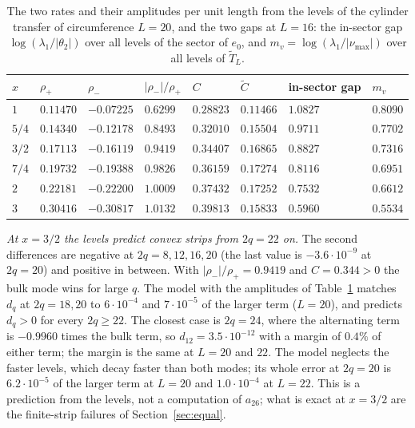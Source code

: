 \documentclass[11pt]{amsart}
\theoremstyle{definition}
\theoremstyle{remark}
\begin{document}
\begin{table}[ht]
\centering
\caption{The two rates and their amplitudes per unit length from the levels of the cylinder
transfer of circumference $L = 20$, and the two gaps at $L = 16$: the in-sector gap
$\log(\lambda_1/|\theta_2|)$ over all levels of the sector of $e_0$, and $m_v = \log(\lambda_1/
|\nu_{\max}|)$ over all levels of $\tilde T_L$.}\label{tab:levels}
\begin{tabular}{llllllll}
\toprule
$x$ & $\rho_+$ & $\rho_-$ & $|\rho_-|/\rho_+$ & $C$ & $\tilde C$ & in-sector gap & $m_v$ \\
\midrule
$1$     & $0.11470$ & $-0.07225$ & $0.6299$ & $0.28823$ & $0.11466$ & $1.0827$ & $0.8090$ \\
$5/4$   & $0.14340$ & $-0.12178$ & $0.8493$ & $0.32010$ & $0.15504$ & $0.9711$ & $0.7702$ \\
$3/2$   & $0.17113$ & $-0.16119$ & $0.9419$ & $0.34407$ & $0.16865$ & $0.8827$ & $0.7316$ \\
$7/4$   & $0.19732$ & $-0.19388$ & $0.9826$ & $0.36159$ & $0.17274$ & $0.8116$ & $0.6951$ \\
$2$     & $0.22181$ & $-0.22200$ & $1.0009$ & $0.37432$ & $0.17252$ & $0.7532$ & $0.6612$ \\
$3$     & $0.30416$ & $-0.30817$ & $1.0132$ & $0.39813$ & $0.15833$ & $0.5960$ & $0.5534$ \\
\bottomrule
\end{tabular}
\end{table}

\emph{At $x = 3/2$ the levels predict convex strips from $2q = 22$ on.} The second differences are negative at
$2q = 8, 12, 16, 20$ (the last value is $-3.6\cdot10^{-9}$ at $2q = 20$) and positive in between. With
$|\rho_-|/\rho_+ = 0.9419$ and $C = 0.344 > 0$ the bulk mode wins for large $q$. The model with the
amplitudes of Table~\ref{tab:levels} matches $d_q$ at $2q = 18, 20$ to $6\cdot10^{-4}$ and
$7\cdot10^{-5}$ of the larger term ($L = 20$), and predicts $d_q > 0$ for every $2q \ge 22$. The closest case is
$2q = 24$, where the alternating term is $-0.9960$ times the bulk term, so $d_{12} = 3.5\cdot10^{-12}$
with a margin of $0.4\%$ of either term; the margin is the same at $L = 20$ and $22$. The model
neglects the faster levels, which decay faster than both modes; its whole error at $2q = 20$ is
$6.2\cdot10^{-5}$ of the larger term at $L = 20$ and $1.0\cdot10^{-4}$ at $L = 22$. This is a
prediction from the levels, not a computation of $a_{26}$; what is exact at $x = 3/2$ are the
finite-strip failures of Section~\ref{sec:equal}.
\end{document}

